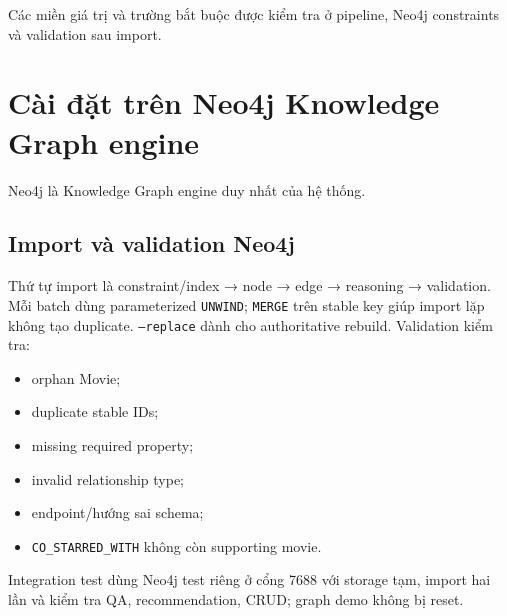 Các miền giá trị và trường bắt buộc được kiểm tra ở pipeline, Neo4j constraints và validation sau import.

\section{Cài đặt trên Neo4j Knowledge Graph engine}

Neo4j là Knowledge Graph engine duy nhất của hệ thống.

\subsection{Import và validation Neo4j}

Thứ tự import là constraint/index → node → edge → reasoning → validation. Mỗi
batch dùng parameterized \texttt{UNWIND}; \texttt{MERGE} trên stable key giúp import lặp không
tạo duplicate. \texttt{--replace} dành cho authoritative rebuild. Validation kiểm tra:

\begin{itemize}
\item orphan Movie;
\item duplicate stable IDs;
\item missing required property;
\item invalid relationship type;
\item endpoint/hướng sai schema;
\item \texttt{CO\_STARRED\_WITH} không còn supporting movie.
\end{itemize}

Integration test dùng Neo4j test riêng ở cổng 7688 với storage tạm, import hai lần
và kiểm tra QA, recommendation, CRUD; graph demo không bị reset.
